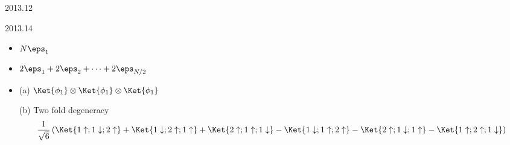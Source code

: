 \documentclass[12pt]{article}
\begin{document}
\begin{solution}{2013.12}

\end{solution}




\begin{solution}{2013.14}
\begin{itemize}
\item
$N \eps_1$ \\

\item
$2\eps_1 + 2\eps_2 + \cdots + 2\eps_{N/2}$

\item
(a) $\Ket{\phi_1} \otimes \Ket{\phi_1} \otimes \Ket{\phi_1}$

(b) Two fold degeneracy
\begin{align*}
\frac{1}{\sqrt{6}} \left( 
\Ket{1\uparrow ; 1\downarrow ; 2\uparrow} 
+\Ket{1\downarrow ; 2\uparrow ; 1\uparrow} 
+\Ket{2\uparrow ; 1\uparrow ; 1\downarrow} 
-\Ket{1\downarrow ; 1\uparrow ; 2\uparrow} 
-\Ket{2\uparrow ; 1\downarrow ; 1\uparrow} 
-\Ket{1\uparrow ; 2\uparrow ; 1\downarrow} 
\right)
\end{align*}


\end{itemize}

\end{solution}
\end{document}
